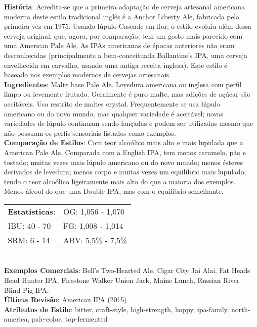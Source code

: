 \textbf{História}: Acredita-se que a primeira adaptação de cerveja artesanal americana moderna deste estilo tradicional inglês é a Anchor Liberty Ale, fabricada pela primeira vez em 1975. Usando lúpulo Cascade em flor; o estilo evoluiu além dessa cerveja original, que, agora, por comparação, tem um gosto mais parecido com uma American Pale Ale. As IPAs americanas de épocas anteriores não eram desconhecidas (principalmente a bem-conceituada Ballantine's IPA, uma cerveja envelhecida em carvalho, usando uma antiga receita inglesa). Este estilo é baseado nos exemplos modernos de cervejas artesanais. \\
\textbf{Ingredientes}: Malte base Pale Ale. Levedura americana ou inglesa com perfil limpo ou levemente frutado. Geralmente é puro malte, mas adições de açúcar são aceitáveis. Uso restrito de maltes crystal. Frequentemente se usa lúpulo americano ou do novo mundo, mas qualquer variedade é aceitável; novas variedades de lúpulo continuam sendo lançadas e podem ser utilizadas mesmo que não possuam os perfis sensoriais listados como exemplos. \\
\textbf{Comparação de Estilos}: Com teor alcoólico mais alto e mais lupulada que a American Pale Ale. Comparada com a English IPA, tem menos caramelo, pão e tostado; muitas vezes mais lúpulo americano ou do novo mundo; menos ésteres derivados de levedura; menos corpo e muitas vezes um equilíbrio mais lupulado; tendo o teor alcoólico ligeiramente mais alto do que a maioria dos exemplos. Menos álcool do que uma Double IPA, mas com o equilíbrio semelhante. \\
\begin{tabular}{@{}p{35mm}p{35mm}@{}}
  \textbf{Estatísticas}: & OG: 1,056 - 1,070 \\
  IBU: 40 - 70  & FG: 1,008 - 1,014 \\
  SRM: 6 - 14  & ABV: 5,5\% - 7,5\%
\end{tabular}\\
\textbf{Exemplos Comerciais}: Bell's Two-Hearted Ale, Cigar City Jai Alai, Fat Heads Head Hunter IPA, Firestone Walker Union Jack, Maine Lunch, Russian River Blind Pig IPA. \\
\textbf{Última Revisão}: American IPA (2015) \\
\textbf{Atributos de Estilo}: bitter, craft-style, high-strength, hoppy, ipa-family, north-america, pale-color, top-fermented